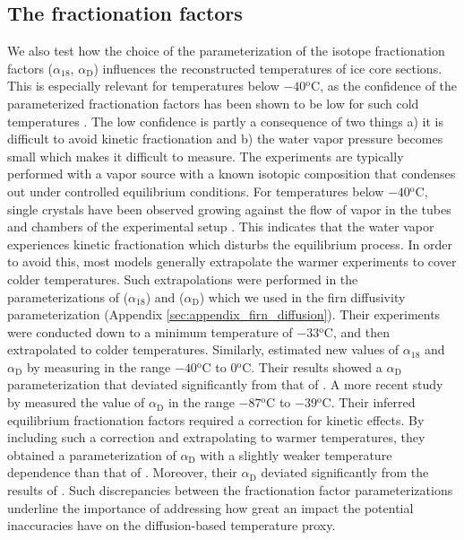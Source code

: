 \documentclass[11pt, draftcls, onecolumn]{IEEEtran} %
\numberwithin{equation}{section}
\numberwithin{table}{section}
\numberwithin{figure}{section}
\begin{document}
\subsection{The fractionation factors} \label{sec:results_fractionation}
We also test how the choice of the parameterization of the isotope fractionation factors ($\alpha_{18}$, $\alpha_\mathrm{D}$) 
influences the reconstructed temperatures of ice core sections. 
This is especially relevant for temperatures below $-40\mathrm{^oC}$, as the confidence of the 
parameterized fractionation factors has been shown to be low for such cold temperatures \citep{Ellehoj2013}. 
The low confidence is partly a consequence of two things a) it is difficult to avoid kinetic fractionation 
and b) the water vapor pressure becomes small which makes it difficult to measure.
The experiments are typically performed with a vapor source with a known isotopic composition 
that condenses out under controlled equilibrium conditions.
For temperatures below $-40\mathrm{^oC}$, single crystals have been observed growing against the flow of vapor
in the tubes and chambers of the experimental setup \citep{Ellehoj2013}.
This indicates that the water vapor experiences kinetic fractionation which disturbs the equilibrium process.
In order to avoid this, most models generally extrapolate the warmer experiments to cover colder temperatures.
Such extrapolations were performed in the parameterizations of \cite{Majoube1971} ($\alpha_{18}$) and \cite{Merlivat1967} ($\alpha_\mathrm{D}$) 
which we used in the firn diffusivity parameterization (Appendix \ref{sec:appendix_firn_diffusion}).
Their experiments were conducted down to a minimum temperature of $-33\mathrm{^oC}$, and then extrapolated to colder temperatures.
Similarly, \cite{Ellehoj2013} estimated new values of $\alpha_{18}$ and $\alpha_\mathrm{D}$
by measuring in the range $-40\mathrm{^oC}$ to $0\mathrm{^oC}$. 
Their results showed a $\alpha_\mathrm{D}$ parameterization that deviated significantly from that of \cite{Merlivat1967}.
A more recent study by \cite{Lamb2015} measured the value of $\alpha_\mathrm{D}$ in the range $-87\mathrm{^oC}$ to $-39\mathrm{^oC}$. 
Their inferred equilibrium fractionation factors required a correction for kinetic effects. 
By including such a correction and extrapolating to warmer temperatures,
they obtained a parameterization of $\alpha_\mathrm{D}$ with a slightly weaker temperature dependence than that of \cite{Merlivat1967}.
Moreover, their $\alpha_\mathrm{D}$ deviated significantly from the results of \cite{Ellehoj2013}.
Such discrepancies between the fractionation factor parameterizations underline the importance of addressing 
how great an impact the potential inaccuracies have on the diffusion-based temperature proxy.
\end{document}
